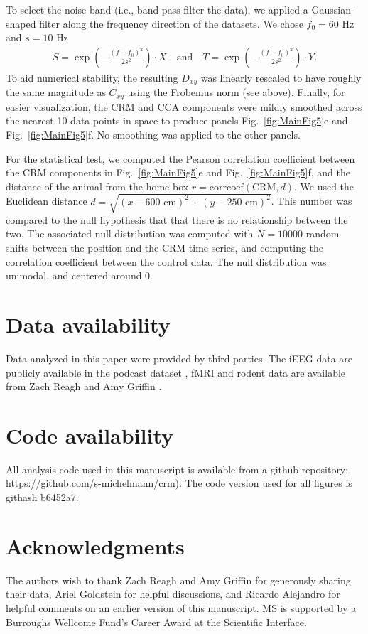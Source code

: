 \documentclass{article}
\begin{document}
To select the noise band (i.e., band-pass filter the data), we applied a Gaussian-shaped filter along the frequency direction of the datasets. We chose $f_0=60\text{ Hz}$ and $s=10\text{ Hz}$
\begin{eqnarray}
S = \exp\left(-\frac{(f-f_0)^2}{2s^2} \right)\cdot X\quad \text{and} \quad T = \exp\left(-\frac{(f-f_0)^2}{2s^2} \right)\cdot Y.
\end{eqnarray}
To aid numerical stability, the resulting $D_{xy}$ was linearly rescaled to have roughly the same magnitude as $C_{xy}$ using the Frobenius norm (see above). Finally, for easier visualization, the CRM and CCA components were mildly smoothed across the nearest 10 data points in space to produce panels Fig.~\ref{fig:MainFig5}e and Fig.~\ref{fig:MainFig5}f. No smoothing was applied to the other panels.\newline

For the statistical test, we computed the Pearson correlation coefficient between the CRM components in Fig.~\ref{fig:MainFig5}e and Fig.~\ref{fig:MainFig5}f, and the distance of the animal from the home box $r = \text{corrcoef}(\text{CRM},d)$. We used the Euclidean distance
$d = \sqrt{(x- 600\text{ cm})^2 + (y- 250\text{ cm})^2}$. This number was compared to the null hypothesis that that there is no relationship between the two. The associated null distribution was computed with $N=10000$ random shifts between the position and the CRM time series, and computing the correlation coefficient between the control data. The null distribution was unimodal, and centered around 0.

\section*{Data availability}
Data analyzed in this paper were provided by third parties. The iEEG data are publicly available in the podcast dataset \cite{zadaPodcastECoGDataset2025a}, fMRI and rodent data are available from Zach Reagh and Amy Griffin \cite{reaghFlexibleReuseCorticohippocampal2023a, rosenblumChoiceBehaviorsPrefrontal2025a}.

\section*{Code availability} \label{sec:Code availability}
All analysis code used in this manuscript is available from a github repository: \\
\href{https://github.com/s-michelmann/crm}{https://github.com/s-michelmann/crm}). The code version used for all figures is githash b6452a7.

\section*{Acknowledgments}
The authors wish to thank Zach Reagh and Amy Griffin for generously sharing their data, Ariel Goldstein for helpful discussions, and Ricardo Alejandro for helpful comments on an earlier version of this manuscript. MS is supported by a Burroughs Wellcome Fund's Career Award at the Scientific Interface.


\end{document}
